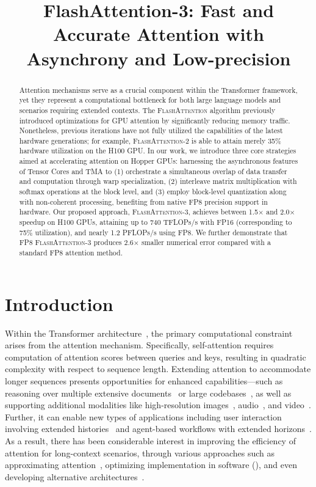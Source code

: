 \title{FlashAttention-3: Fast and Accurate Attention with Asynchrony and Low-precision}

\begin{abstract}
Attention mechanisms serve as a crucial component within the Transformer framework, yet they represent a computational bottleneck for both large language models and scenarios requiring extended contexts. The \textsc{FlashAttention} algorithm previously introduced optimizations for GPU attention by significantly reducing memory traffic. Nonetheless, previous iterations have not fully utilized the capabilities of the latest hardware generations; for example, \textsc{FlashAttention-2} is able to attain merely 35\% hardware utilization on the H100 GPU. In our work, we introduce three core strategies aimed at accelerating attention on Hopper GPUs: harnessing the asynchronous features of Tensor Cores and TMA to (1) orchestrate a simultaneous overlap of data transfer and computation through warp specialization, (2) interleave matrix multiplication with softmax operations at the block level, and (3) employ block-level quantization along with non-coherent processing, benefiting from native FP8 precision support in hardware. Our proposed approach, \textsc{FlashAttention-3}, achieves between 1.5$\times$ and 2.0$\times$ speedup on H100 GPUs, attaining up to 740 TFLOPs/s with FP16 (corresponding to 75\% utilization), and nearly 1.2 PFLOPs/s using FP8. We further demonstrate that FP8 \textsc{FlashAttention-3} produces 2.6$\times$ smaller numerical error compared with a standard FP8 attention method.
\end{abstract}

\section{Introduction}
\label{sec:intro}

Within the Transformer architecture~\citep{vaswani2017attention}, the primary computational constraint arises from the attention mechanism. Specifically, self-attention requires computation of attention scores between queries and keys, resulting in quadratic complexity with respect to sequence length. Extending attention to accommodate longer sequences presents opportunities for enhanced capabilities—such as reasoning over multiple extensive documents~\citep{guo2021longt5,shaham2022scrolls,peng2023yarn} or large codebases~\citep{roziere2023code, li2023starcoder}, as well as supporting additional modalities like high-resolution images~\citep{chen2022scaling}, audio~\citep{gulati2020conformer}, and video~\citep{ho2022video}. Further, it can enable new types of applications including user interaction involving extended histories~\citep{sun2019bert4rec} and agent-based workflows with extended horizons~\citep{yao2022react}. As a result, there has been considerable interest in improving the efficiency of attention for long-context scenarios, through various approaches such as approximating attention~\citep{katharopoulos2020transformers,choromanski2020rethinking, tay2020efficient}, optimizing implementation in software (\citep{rabe2021self,dao2022flashattention,kwon2023efficient}), and even developing alternative architectures~\citep{peng2023rwkv,sun2023retentive,gu2023mamba}.

